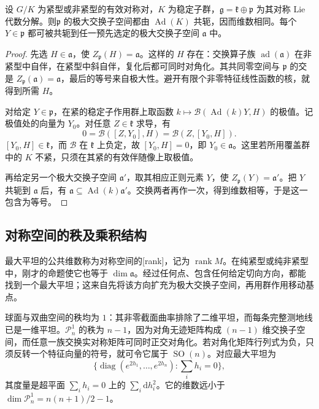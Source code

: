 \begin{proposition}\label{g3:prop:maximal-abelian-conjugacy}
	设 \(G/K\) 为紧型或非紧型的有效对称对，\(K\) 为稳定子群，\(\mathfrak g=\mathfrak k\oplus\mathfrak p\) 为其对称 Lie 代数分解。则\(\mathfrak p\) 的极大交换子空间都由 \(\operatorname{Ad}(K)\) 共轭，因而维数相同。每个 \(Y\in\mathfrak p\) 都可被共轭到任一预先选定的极大交换子空间 \(\mathfrak a\) 中。
\end{proposition}
\begin{proof}
	先选 \(H\in\mathfrak a\)，使 \(Z_{\mathfrak p}(H)=\mathfrak a\)。这样的 \(H\) 存在：交换算子族 \(\operatorname{ad}(\mathfrak a)\) 在非紧型中自伴，在紧型中斜自伴，复化后都可同时对角化。其共同零空间与 \(\mathfrak p\) 的交是 \(Z_{\mathfrak p}(\mathfrak a)=\mathfrak a\)，最后的等号来自极大性。避开有限个非零特征线性函数的核，就得到所需 \(H\)。

	对给定 \(Y\in\mathfrak p\)，在紧的稳定子作用群上取函数 \(k\mapsto\mathcal B(\operatorname{Ad}(k)Y,H)\) 的极值。记极值处的向量为 \(Y_0\)。对任意 \(Z\in\mathfrak k\) 求导，有
	\[
		0=\mathcal B([Z,Y_0],H)=\mathcal B(Z,[Y_0,H]).
	\]
	\([Y_0,H]\in\mathfrak k\)，而 \(\mathcal B\) 在 \(\mathfrak k\) 上负定，故 \([Y_0,H]=0\)，即 \(Y_0\in\mathfrak a\)。这里若所用覆盖群中的 \(K\) 不紧，只须在其紧的有效伴随像上取极值。

	再给定另一个极大交换子空间 \(\mathfrak a'\)，取其相应正则元素 \(Y\)，使 \(Z_{\mathfrak p}(Y)=\mathfrak a'\)。把 \(Y\) 共轭到 \(\mathfrak a\) 后，有 \(\mathfrak a\subseteq\operatorname{Ad}(k)\mathfrak a'\)。交换两者再作一次，得到维数相等，于是这一包含为等号。
\end{proof}

\subsection{对称空间的秩及乘积结构}
\label{g3:subsec:0504:06}

最大平坦的公共维数称为对称空间的[rank]，记为 \(\operatorname{rank}M\)。在纯紧型或纯非紧型中，刚才的命题使它也等于 \(\dim\mathfrak a\)。经过任何点、包含任何给定切向方向，都能找到一个最大平坦；这来自先将该方向扩充为极大交换子空间，再用群作用移动基点。

\ProseParagraphBreak

球面与双曲空间的秩均为 \(1\)：其非零截面曲率排除了二维平坦，而每条完整测地线已是一维平坦。\(\mathcal P_n^1\) 的秩为 \(n-1\)，因为对角无迹矩阵构成 \((n-1)\) 维交换子空间，而任意一族交换实对称矩阵可同时正交对角化。若对角化矩阵行列式为负，只须反转一个特征向量的符号，就可令它属于 \(\operatorname{SO}(n)\)。对应最大平坦为
\[
	\{\operatorname{diag}(e^{2h_1},\ldots,e^{2h_n}):\textstyle\sum_i h_i=0\},
\]
其度量是超平面 \(\sum_i h_i=0\) 上的 \(\sum_i\mathrm dh_i^2\)。它的维数远小于 \(\dim\mathcal P_n^1=n(n+1)/2-1\)。

